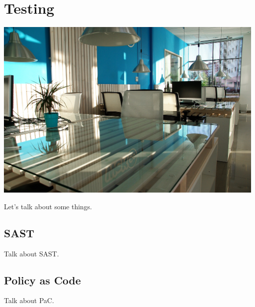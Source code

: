 \chapter{Testing}

\includegraphics[scale=0.85]{../images/office-space-1744803_1920.jpg}

Let's talk about some things. 

\section{SAST}
\justify
Talk about SAST.

\section{Policy as Code}
\justify
Talk about PaC.